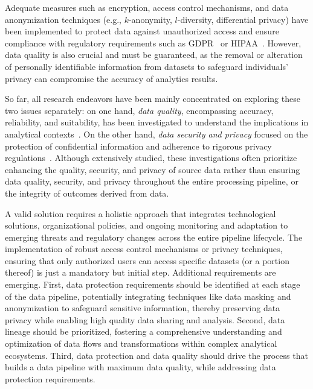 Adequate measures such as encryption, access control mechanisms, and data anonymization techniques (e.g., $k$-anonymity, $l$-diversity, differential privacy) have been implemented to protect data against unauthorized access and ensure compliance with regulatory requirements such as GDPR~\cite{EuropeanParliament2016a} or HIPAA~\cite{hipaa1996}. {\color{OurColor}However, data quality is also crucial and must be guaranteed, as the removal or alteration of personally identifiable information from datasets to safeguard individuals' privacy can compromise the accuracy of analytics results.}

So far, all research endeavors have been mainly concentrated on exploring these two issues separately: on one hand, \emph{data quality}, encompassing accuracy, reliability, and suitability, has been investigated to understand the implications in analytical contexts~\cite{ANTONGIACOMO}.  On the other hand, \emph{data security and privacy} focused on the protection of confidential information and adherence to rigorous privacy regulations~\cite{ANTONGIACOMO}. {\color{OurColor}Although extensively studied, these investigations often prioritize enhancing the quality, security, and privacy of source data rather than ensuring data quality, security, and privacy throughout the entire processing pipeline, or the integrity of outcomes derived from data.}

A valid solution requires a holistic approach that integrates technological solutions, organizational policies, and ongoing monitoring and adaptation to emerging threats and regulatory changes {\color{OurColor}across the entire pipeline lifecycle.} The implementation of robust access control mechanisms or privacy techniques, ensuring that only authorized users can access specific datasets (or a portion thereof) is just a mandatory but initial step.
%
Additional requirements are emerging. First, data protection requirements should be identified at each stage of the data {\color{OurColor}pipeline}, potentially integrating techniques like data masking and anonymization to safeguard sensitive information, thereby preserving data privacy while enabling high quality data sharing and analysis. Second, data lineage should be prioritized, fostering a comprehensive understanding and optimization of data flows and transformations within complex analytical ecosystems. {\color{OurColor}Third, data protection and data quality should drive the process that builds a data pipeline with maximum data quality, while addressing data protection requirements.}

